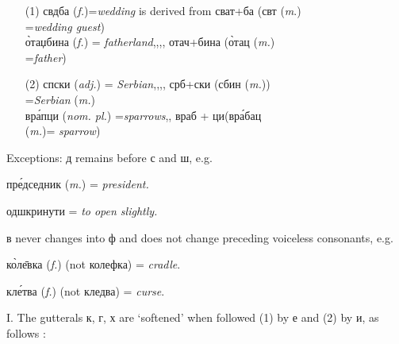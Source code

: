 \begin{itemize}
    \item[(1)] свдба (\emph{f.})=\emph{wedding} is derived
        from сват+ба (свт (\emph{m}.)\\
        \hspace*{3in}=\emph{wedding guest})\\
        \`{о}таџбина ({\it f.}) = \textit{fatherland}\quad ,,\qquad,, \quad
        отач+бина (\`{о}тац ({\it m.})\\
        \hspace*{3in}=\emph{father})  
    \item[(2)] спски ({\it adj.}) =
        \emph{Serbian}\qquad,,\qquad,, \quad 
        срб+ски (сбин ({\it m.}))\\
        \hspace*{3in}=\emph{Serbian} ({\it m.})\\
        вр\'{а}пци ({\it nom. pl.}) =\emph{sparrows}\qquad,, \quad
        враб + ци\quad(вр\'{а}бац\\
        \hspace*{3in}({\it m.})= \emph{sparrow})
\end{itemize}

Exceptions: д remains before с and ш, e.g.

\qquad\qquad пр\'{е}дседник ({\it m.}) = \emph{president.}

\qquad\qquad одшкринути = \emph{to open slightly.}

в never changes into ф and does not change preceding voiceless consonants, e.g.

\qquad\qquad к\`{о}л\={е}вка ({\it f.}) (not колефка) = \textit{cradle}.

\qquad\qquad кл\'{е}тва ({\it f.}) (not кледва) = \textit{curse}.


I. The gutterals к, г, х are `softened' when followed (1) by е and (2) by и, as follows :
